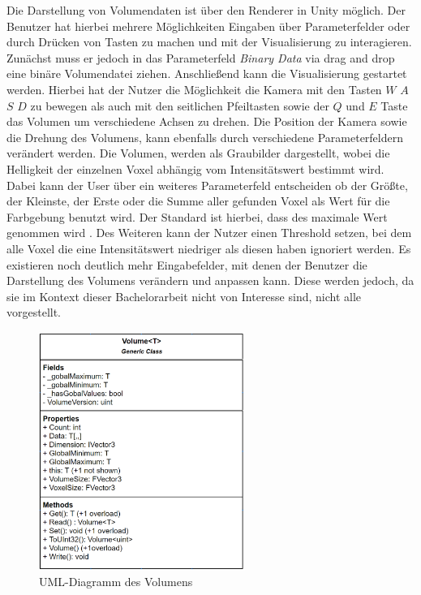 Die Darstellung von Volumendaten ist über den Renderer in Unity möglich. Der Benutzer hat hierbei mehrere Möglichkeiten Eingaben über Parameterfelder oder durch Drücken von Tasten zu machen und mit der Visualisierung zu interagieren. Zunächst muss er jedoch in das Parameterfeld \textit{Binary Data} via drag and drop eine binäre Volumendatei ziehen. Anschließend kann die Visualisierung gestartet werden. Hierbei hat der Nutzer die Möglichkeit die Kamera mit den Tasten $W$ $A$ $S$ $D$ zu bewegen als auch mit den seitlichen Pfeiltasten sowie der $Q$ und $E$ Taste das Volumen um verschiedene Achsen zu drehen. Die Position der Kamera sowie die Drehung des Volumens, kann ebenfalls durch verschiedene Parameterfeldern verändert werden.
\newline
Die Volumen, werden als Graubilder dargestellt, wobei die Helligkeit der einzelnen Voxel abhängig vom Intensitätswert bestimmt wird. Dabei kann der User über ein weiteres Parameterfeld entscheiden ob der Größte, der Kleinste, der Erste oder die Summe aller gefunden Voxel als Wert für die Farbgebung benutzt wird. Der Standard ist hierbei, dass des maximale Wert genommen wird . Des Weiteren kann der Nutzer einen Threshold setzen, bei dem alle Voxel die eine Intensitätswert niedriger als diesen haben ignoriert werden.
\newline
Es existieren noch deutlich mehr Eingabefelder, mit denen der Benutzer die Darstellung des Volumens verändern und anpassen kann. Diese werden jedoch, da sie im Kontext dieser Bachelorarbeit nicht von Interesse sind, nicht alle vorgestellt.


\begin{figure}
\centering
\includegraphics[width=0.6\textwidth]{Logos/Volume_UML.PNG}
\caption{UML-Diagramm des Volumens} 
\label{fig:volume_uml} 
\end{figure}


